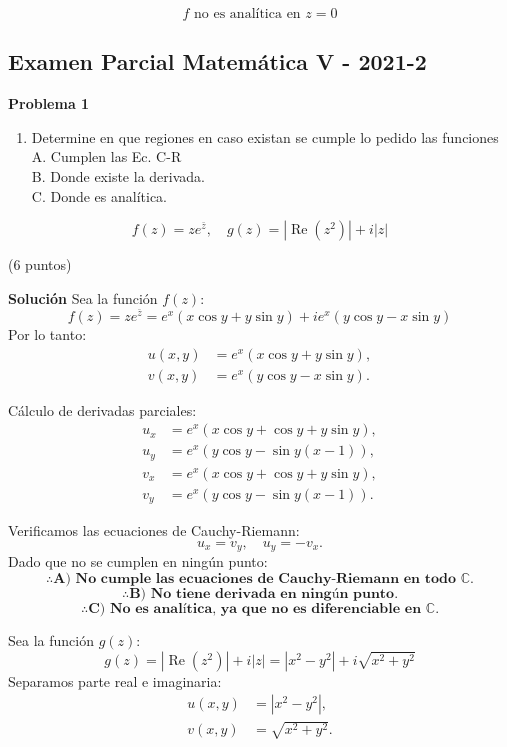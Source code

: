 \documentclass[a4paper,12pt]{article}
\begin{document}
\[
f \text{ no es analítica en } z = 0
\]
\newpage
\subsection{Examen Parcial Matemática V - 2021-2}
{\bf Problema 1}
\begin{enumerate}
  \item Determine en que regiones en caso existan se cumple lo pedido las funciones\\
A. Cumplen las Ec. C-R\\
B. Donde existe la derivada.\\
C. Donde es analítica.
\end{enumerate}

\[
f(z) = z e^{\bar{z}}, \quad g(z) = \left|\operatorname{Re}(z^{2})\right| + i |z|
\]

(6 puntos)

{\bf Solución}
Sea la función $f(z)$:\\
\[
f(z) = z e^{\bar{z}} = e^x (x \cos y + y \sin y) + i e^x (y \cos y - x \sin y)
\]
Por lo tanto:
\[
\begin{aligned}
    u(x, y) &= e^x (x \cos y + y \sin y), \\
    v(x, y) &= e^x (y \cos y - x \sin y).
\end{aligned}
\]

Cálculo de derivadas parciales:
\[
\begin{aligned}
    u_x &= e^x (x \cos y + \cos y + y \sin y), \\
    u_y &= e^x (y \cos y - \sin y (x - 1)), \\
    v_x &= e^x (x \cos y + \cos y + y \sin y), \\
    v_y &= e^x (y \cos y - \sin y (x - 1)).
\end{aligned}
\]

Verificamos las ecuaciones de Cauchy-Riemann:
\[
u_x = v_y, \quad u_y = -v_x.
\]
Dado que no se cumplen en ningún punto:
\[
\therefore \textbf{A) No cumple las ecuaciones de Cauchy-Riemann en todo } \mathbb{C}.
\]
\[
\therefore \textbf{B) No tiene derivada en ningún punto.}
\]
\[
\therefore \textbf{C) No es analítica, ya que no es diferenciable en } \mathbb{C}.
\]

Sea la función $g(z)$:\\
\[
g(z) = \left|\operatorname{Re}(z^2)\right| + i |z| = \left|x^2 - y^2\right| + i \sqrt{x^2 + y^2}
\]
Separamos parte real e imaginaria:
\[
\begin{aligned}
    u(x, y) &= \left| x^2 - y^2 \right|, \\
    v(x, y) &= \sqrt{x^2 + y^2}.
\end{aligned}
\]
\end{document}
